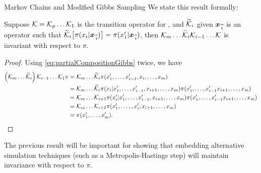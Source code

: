 \begin{chapter}{Markov Chains and Modified Gibbs Sampling}
We state this result formally:
\begin{cor} \label{cor:conditionalTransition}
  Suppose $\mathcal K = \mathcal K_p\dots\mathcal K_1$ is the transition operator for , and $\widetilde {\mathcal K}_i$ given $\mbox{\boldmath$x$}_{\,\widehat{i}}$ is an operator such that $\widetilde {\mathcal K}_i \big[\pi(x_i|\mbox{\boldmath$x$}_{\,\widehat{i}})\big] = \pi(x_1'|\mbox{\boldmath$x$}_{\,\widehat{i}})$, then $\mathcal K_m\dots\widetilde {\mathcal K}_i\mathcal K_{i-1}\dots\mathcal K$ is invariant with respect to $\pi$.
\end{cor}
\begin{proof} 
  Using \eqref{eq:partialCompositionGibbs} twice, we have 
  \begin{align}
    \left(\mathcal K_m\dots\widetilde {\mathcal K}_i\right)\mathcal K_{i-1}\dots\mathcal K_1 \pi 
      &= \mathcal K_m\dots \widetilde {\mathcal K}_i \pi(x_1',\dots,x_{i-1}',x_i,\dots,x_m) \nonumber\\
      &= \mathcal K_m\dots \widetilde {\mathcal K}_i \pi(x_i|x_1',\dots,x_{i-1}',x_{i+1},\dots,x_m)\pi(x_1',\dots,x_{i-1}'x_{i+1},\dots,x_m) \nonumber\\
      &= \mathcal K_m\dots \mathcal K_{i+1}\pi(x_i'|x_1',\dots,x_{i-1}',x_{i+1},\dots,x_m)\pi(x_1',\dots,x_{i-1}'x_{i+1},\dots,x_m) \nonumber\\
      &= \mathcal K_m\dots \mathcal K_{i+1}\pi(x_1',\dots,,x_i',x_{i+1},\dots,x_m) \nonumber\\
      &= \pi(x_1',\dots,x_m').
  \end{align}
\end{proof}
The previous result will be important for showing that embedding alternative simulation techniques (such as a Metropolis-Hastings step) will maintain invariance with respect to $\pi$.


\end{chapter}
